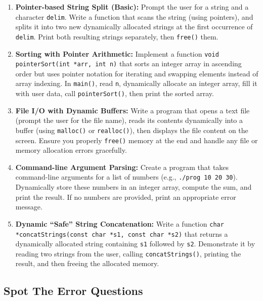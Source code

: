 \documentclass[a4paper,12pt]{article}
\begin{document}
\begin{enumerate}
  \item \textbf{Pointer-based String Split (Basic):}  
  Prompt the user for a string and a character \texttt{delim}. Write a function that scans the string (using pointers), and splits it into two new dynamically allocated strings at the first occurrence of \texttt{delim}. Print both resulting strings separately, then \texttt{free()} them.

  \item \textbf{Sorting with Pointer Arithmetic:}  
  Implement a function \texttt{void pointerSort(int *arr, int n)} that sorts an integer array in ascending order but uses pointer notation for iterating and swapping elements instead of array indexing. In \texttt{main()}, read \texttt{n}, dynamically allocate an integer array, fill it with user data, call \texttt{pointerSort()}, then print the sorted array.

  \item \textbf{File I/O with Dynamic Buffers:}  
  Write a program that opens a text file (prompt the user for the file name), reads its contents dynamically into a buffer (using \texttt{malloc()} or \texttt{realloc()}), then displays the file content on the screen. Ensure you properly \texttt{free()} memory at the end and handle any file or memory allocation errors gracefully.

  \item \textbf{Command-line Argument Parsing:}  
  Create a program that takes command-line arguments for a list of numbers (e.g., \texttt{./prog 10 20 30}). Dynamically store these numbers in an integer array, compute the sum, and print the result. If no numbers are provided, print an appropriate error message.

  \item \textbf{Dynamic “Safe” String Concatenation:}  
  Write a function \texttt{char *concatStrings(const char *s1, const char *s2)} that returns a dynamically allocated string containing \texttt{s1} followed by \texttt{s2}. Demonstrate it by reading two strings from the user, calling \texttt{concatStrings()}, printing the result, and then freeing the allocated memory.

\end{enumerate}

\newpage

\subsection{Spot The Error Questions}
\end{document}
